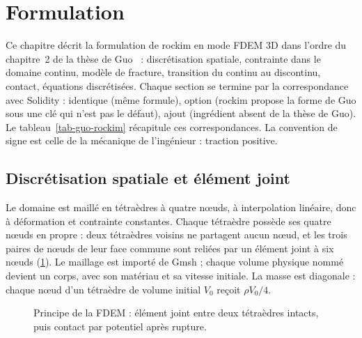 \section{Formulation}
\label{sec-formulation}

Ce chapitre décrit la formulation de rockim en mode FDEM 3D dans l'ordre du chapitre~2 de la thèse de Guo~\cite{guo2014thesis} : discrétisation spatiale, contrainte dans le domaine continu, modèle de fracture, transition du continu au discontinu, contact, équations discrétisées. Chaque section se termine par la correspondance avec Solidity : identique (même formule), option (rockim propose la forme de Guo sous une clé qui n'est pas le défaut), ajout (ingrédient absent de la thèse de Guo). Le tableau~\ref{tab-guo-rockim} récapitule ces correspondances. La convention de signe est celle de la mécanique de l'ingénieur : traction positive.

\subsection{Discrétisation spatiale et élément joint}

Le domaine est maillé en tétraèdres à quatre nœuds, à interpolation linéaire, donc à déformation et contrainte constantes. Chaque tétraèdre possède ses quatre nœuds en propre : deux tétraèdres voisins ne partagent aucun nœud, et les trois paires de nœuds de leur face commune sont reliées par un élément joint à six nœuds (\cref{fig-fdem}). Le maillage est importé de Gmsh ; chaque volume physique nommé devient un corps, avec son matériau et sa vitesse initiale. La masse est diagonale : chaque nœud d'un tétraèdre de volume initial $V_0$ reçoit $\rho V_0/4$.

\begin{figure}[htbp]
\caption{Principe de la FDEM : élément joint entre deux tétraèdres intacts, puis contact par potentiel après rupture.}
\label{fig-fdem}
\end{figure}

